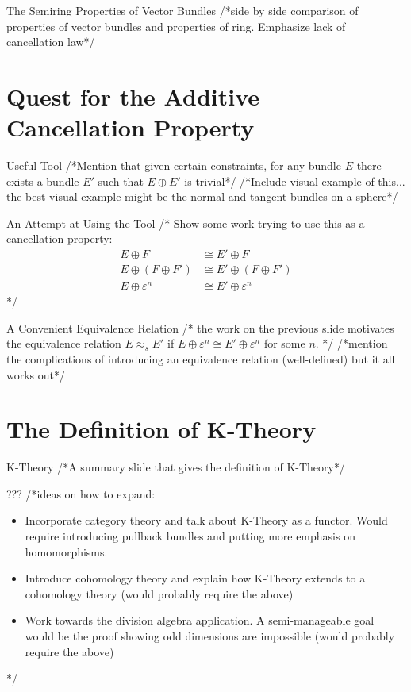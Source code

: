 \documentclass[12pt]{beamer}
\newcommand{\toadd}[1]{/*#1*/}
\newcommand{\iso}{\cong} %
\newcommand{\siso}{\approx_s} %
\newcommand{\tbund}[1]{\varepsilon^{#1}}
\newcommand{\op}{\oplus}
\begin{document}
\begin{frame}{The Semiring Properties of Vector Bundles}
	\toadd{side by side comparison of properties of vector bundles and properties of ring. Emphasize lack of cancellation law}
\end{frame}

\section{Quest for the Additive Cancellation Property}

\begin{frame}{Useful Tool}
	\toadd{Mention that given certain constraints, for any bundle $E$ there exists a bundle $E'$ such that $E \op E'$ is trivial}
	\toadd{Include visual example of this... the best visual example might be the normal and tangent bundles on a sphere}
\end{frame}

\begin{frame}{An Attempt at Using the Tool}
	\toadd{
		Show some work trying to use this as a cancellation property:
		\begin{align*}
			E \op F &\iso E' \op F\\
			E \op (F \op F') &\iso E' \op (F \op F')\\
			E \op \tbund{n} &\iso E' \op \tbund{n}
		\end{align*}
	}
\end{frame}

\begin{frame}{A Convenient Equivalence Relation}
	\toadd{
	the work on the previous slide motivates the equivalence relation $E \siso E'$ if $E \op \tbund{n} \iso E' \op \tbund{n}$ for some $n$.
	}
	\toadd{mention the complications of introducing an equivalence relation (well-defined) but it all works out}

\end{frame}

\section{The Definition of K-Theory}

\begin{frame}{K-Theory}
	\toadd{A summary slide that gives the definition of K-Theory}
\end{frame}

\begin{frame}{???}
	\toadd{ideas on how to expand:
		\begin{itemize}
			\item Incorporate category theory and talk about K-Theory as a functor. Would require introducing pullback bundles and putting more emphasis on homomorphisms.
			\item Introduce cohomology theory and explain how K-Theory extends to a cohomology theory (would probably require the above)
			\item Work towards the division algebra  application. A semi-manageable goal would be the proof showing odd dimensions are impossible (would probably require the above)
		\end{itemize}
	}
\end{frame}
\end{document}
